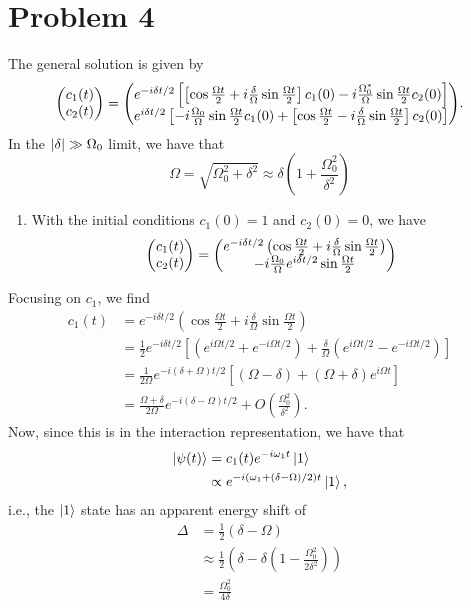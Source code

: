 \documentclass[12pt]{article}
\begin{document}
\section*{Problem 4}
The general solution is given by
\[ \mqty(c_1(t)\\c_2(t)) = \mqty(e^{-i\delta t/2}\left[\left[\cos\frac{\Omega t}{2} + i\frac{\delta}{\Omega}\sin\frac{\Omega t}{2}\right]c_1(0) - i\frac{\Omega_0^*}{\Omega}\sin\frac{\Omega t}{2}c_2(0)\right] \\ e^{i\delta t/2}\left[-i\frac{\Omega_0}{\Omega}\sin\frac{\Omega t}{2}c_1(0) + \left[\cos\frac{\Omega t}{2} - i\frac{\delta}{\Omega}\sin\frac{\Omega t}{2}\right]c_2(0)\right]). \]
In the $\abs{\delta} \gg \Omega_0$ limit, we have that
\[ \Omega = \sqrt{\Omega_0^2 + \delta^2} \approx \delta(1 + \frac{\Omega_0^2}{\delta^2}) \]
\begin{enumerate}[label=(\alph*)]
    \item With the initial conditions $c_1(0) = 1$ and $c_2(0) = 0$, we have 
    \[ \mqty(c_1(t)\\c_2(t)) = \mqty(e^{-i\delta t/2}\left(\cos\frac{\Omega t}{2} + i\frac{\delta}{\Omega}\sin\frac{\Omega t}{2}\right)\\ -i\frac{\Omega_0}{\Omega}e^{i\delta t/2}\sin\frac{\Omega t}{2}) \]
\end{enumerate}
Focusing on $c_1$, we find
\begin{align*}
    c_1(t) &= e^{-i\delta t/2}\left(\cos\frac{\Omega t}{2} + i\frac{\delta}{\Omega}\sin\frac{\Omega t}{2}\right) \\
    &= \frac{1}{2}e^{-i\delta t/2}\left[\left(e^{i\Omega t/2} + e^{-i\Omega t/2}\right) + \frac{\delta}{\Omega}\left(e^{i\Omega t/2} - e^{-i\Omega t/2}\right)\right] \\
    &= \frac{1}{2\Omega}e^{-i(\delta+\Omega)t/2}\left[(\Omega - \delta) + (\Omega + \delta)e^{i\Omega t}\right] \\
    &= \frac{\Omega + \delta}{2\Omega}e^{-i(\delta-\Omega)t/2} + O(\frac{\Omega_0^2}{\delta^2}).
\end{align*}
Now, since this is in the interaction representation, we have that
\begin{align*}
    \ket{\psi(t)} &= c_1(t)e^{-i\omega_1t}\ket{1} \\
    &\propto e^{-i(\omega_1 + (\delta-\Omega)/2)t}\ket{1},
\end{align*}
i.e., the $\ket{1}$ state has an apparent energy shift of
\begin{align*}
    \Delta &= \frac{1}{2}(\delta - \Omega) \\
    &\approx \frac{1}{2}\left(\delta - \delta(1 - \frac{\Omega_0^2}{2\delta^2})\right) \\
    &= \frac{\Omega_0^2}{4\delta}
\end{align*}



\end{document}
